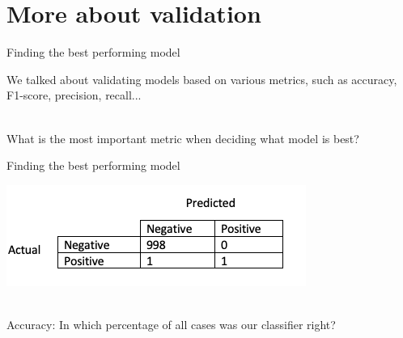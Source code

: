 \documentclass[handout]{beamer}
\begin{document}
	
	
	
	
	


\section{More about validation}

\begin{frame}{Finding the best performing model}

We talked about validating models based on various metrics, such as accuracy, F1-score, precision, recall... \\\

What is the most important metric when deciding what model is best?
\end{frame}



\begin{frame}{Finding the best performing model}

\begin{center}
	\includegraphics[width=\linewidth,height=\textheight,keepaspectratio]{../pictures/ConfusionMatrix1.png} \\\
\end{center}

Accuracy: In which percentage of all cases was our classifier right? 


\end{frame}
\end{document}
